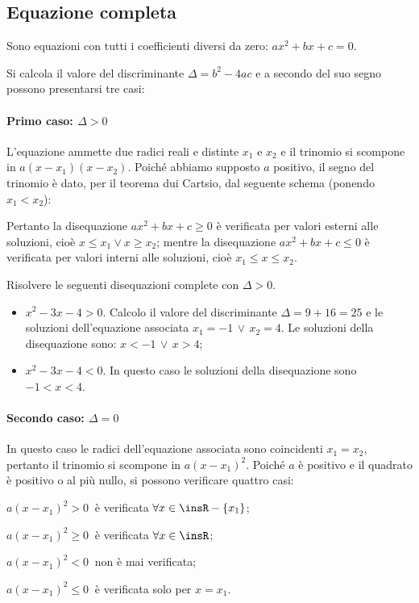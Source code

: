 \subsection{Equazione completa}
Sono equazioni con tutti i coefficienti diversi da zero: $ax^2+bx+c=0$.

Si calcola il valore del discriminante $\Delta =b^2-4{ac}$ e a secondo del suo segno possono presentarsi tre casi:

\paragraph{Primo caso: $\Delta >0$}
L'equazione ammette due radici reali e distinte $x_1$ e $x_2$ e il trinomio si scompone in $a(x-x_1)(x-x_2)$. Poiché abbiamo supposto $a$ positivo, il segno del trinomio è dato, per il teorema dui Cartsio, dal seguente schema (ponendo $x_1<x_2$):
\begin{center}

\end{center}
Pertanto la disequazione ${ax}^2+{bx}+c\ge 0$ è verificata per valori esterni alle soluzioni, cioè $x\le x_1\vee x\ge x_2$; mentre la disequazione ${ax}^2+{bx}+c\le 0$ è verificata per valori interni alle soluzioni, cioè $x_1\le x\le x_2$.

\begin{exrig}
\begin{esempio}
Risolvere le seguenti disequazioni complete con $\Delta>0$.
\begin{itemize}
\item $x^2-3x-4>0$. Calcolo il valore del discriminante $\Delta =9+16=25$ e le soluzioni dell'equazione associata $x_1=-1\,\vee\,x_2=4$. Le soluzioni della disequazione sono: $x<-1\,\vee\,x>4$;
\item $x^2-3x-4<0$. In questo caso le soluzioni della disequazione sono $-1<x<4$.
\end{itemize}
\end{esempio}
\end{exrig}

\paragraph{Secondo caso: $\Delta =0$} In questo caso le radici dell'equazione associata sono coincidenti $x_1=x_2$, pertanto il trinomio si scompone in $a(x-x_1)^2$. Poiché $a$ è positivo e il quadrato è positivo o al più nullo, si possono verificare quattro casi:

\begin{itemize*}
\item $a(x-x_1)^2>0\:$ è verificata $\forall x\in \insR- \{x_1\}$;
\item $a(x-x_1)^2\ge 0\:$ è verificata $\forall x\in \insR$;
\item $a(x-x_1)^2<0\:$ non è mai verificata;
\item $a(x-x_1)^2\le 0\:$ è verificata solo per $x=x_1$.
\end{itemize*}

